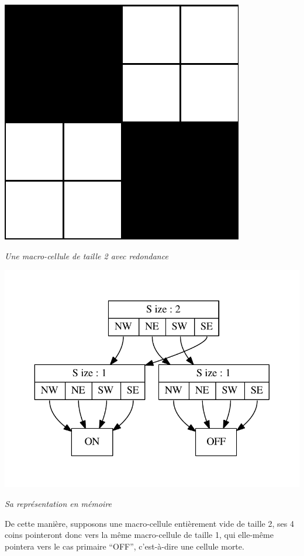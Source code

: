 \documentclass[a4paper,12pt]{report}
\begin{document}
\begin{center}
    \includegraphics[scale=0.2]{redudancy_ex.png}

    \textit{Une macro-cellule de taille 2 avec redondance}

    \medskip

    \includegraphics{redudancy.pdf}

    \textit{Sa représentation en mémoire}
\end{center}
\medskip

De cette manière, supposons une macro-cellule entièrement vide de taille 2, ses
4 coins pointeront donc vers la même macro-cellule de taille 1, qui elle-même
pointera vers le cas primaire ``OFF'', c'est-à-dire une cellule morte.
\end{document}
